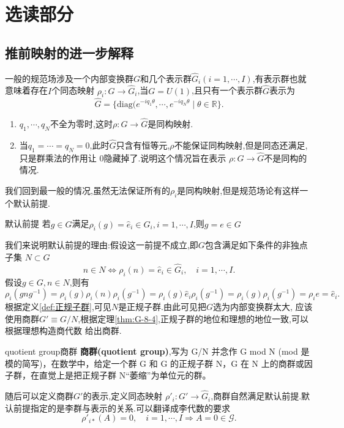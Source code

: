 \documentclass[../main.tex]{subfiles}
\begin{document}
 \section{选读部分}
 \subsection{推前映射的进一步解释}
 \label{sec:I-5-1}
 一般的规范场涉及一个内部变换群$G$和几个表示群$\hat{G}_i(i = 1, \cdots , I)$,有表示群也就意味着存在$I$个同态映射 $\rho_i: G \to  \hat{G}_i$,当$G = U(1)$,且只有一个表示群$\hat{G}$表示为 \[
 \hat{G} = \{\text{diag}(e^{-iq_1 \theta}, \cdots , e^{-iq_N \theta} \mid \theta \in \mathbb{R}\}
 .\] 
 \begin{enumerate}
 \item $q_1,\cdots ,q_N$不全为零时,这时$\rho:G \to \hat{G}$是同构映射.
 \item 当$q_1= \cdots = q_N = 0$,此时$\hat{G}$只含有恒等元,$\rho$不能保证同构映射,但是同态还满足,只是群乘法的作用让 $0$隐藏掉了.说明这个情况旨在表示 $\rho: G \to \hat{G}$不是同构的情况.
 \end{enumerate}
 我们回到最一般的情况,虽然无法保证所有的$\rho_i$是同构映射,但是规范场论有这样一个默认前提.
\begin{proposition}
  {默认前提}{}
  若$g\in G$满足$\rho_i(g) = \hat{e}_i \in \hat{G}_i, i = 1, \cdots ,I$,则$g = e \in G$
 \end{proposition}
 我们来说明默认前提的理由:假设这一前提不成立,即$G$包含满足如下条件的非独点子集 $N \subset G$\[
 n \in N \Leftrightarrow \rho_i(n) = \hat{e}_i \in \hat{G}_i, \quad i = 1, \cdots , I
 .\] 
 假设$g \in G, n\in N$,则有\[
 \rho_i(g n g^{-1}) = \rho_i(g) \rho_i(n) \rho_i(g^{-1}) = \rho_i(g) \hat{e}_i \rho_i(g^{-1}) = \rho_i(g)\rho_i(g^{-1}) = \rho_i{e} = \hat{e}_i
 .\] 
 根据定义\ref{def:正规子群},可见$N$是正规子群.由此可见把$G$选为内部变换群太大, 应该使用商群$G' \equiv  G / N$,根据定理\ref{thm:G-8-4},正规子群的地位和理想的地位一致,可以根据理想构造商代数
 给出商群.
 \begin{definition}
 {quotient group}{商群}
 \textbf{商群(quotient group)},写为 G/N 并念作 G mod N (mod 是模的简写)，在数学中，给定一个群 G 和 G 的正规子群 N，G 在 N 上的商群或因子群，在直觉上是把正规子群 N“萎缩”为单位元的群。
 \end{definition}
 随后可以定义商群$G'$的表示,定义同态映射 $\rho'_i: G'\to \hat{G}_i$,商群自然满足默认前提.默认前提指定的是李群与表示的关系.可以翻译成李代数的要求
 \begin{equation}
 \label{eq:I-5-5}
 \rho'_{i*}(A) = 0, \quad i = 1,\cdots,I \Rightarrow A = 0 \in \mathscr{G}
 .\end{equation} 
\end{document}
